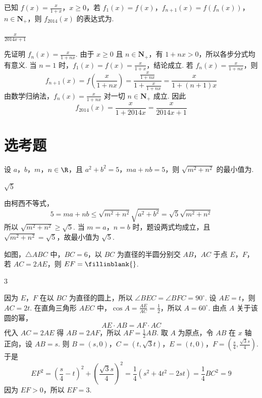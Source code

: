 \begin{problem}
已知 \( f(x) = \frac{x}{1 + x} \)，\( x \geqslant 0 \)，若 \( f_1(x) = f(x) \)，\( f_{n+1}(x) = f(f_n(x)) \)，\( n \in \mathbf{N}_+ \)，则 \( f_{2014}(x) \) 的表达式为\fillinblank{}.
\begin{answer}
\(\frac{x}{2014x+1}\)
\end{answer}
\begin{solution}
先证明 \(f_n(x)=\frac{x}{1+nx}\). 由于 \(x\geqslant0\) 且 \(n\in\mathbf N_+\)，有 \(1+nx>0\)，所以各步分式均有意义. 当 \(n=1\) 时，\(f_1(x)=f(x)=\frac{x}{1+x}\)，结论成立. 若 \(f_n(x)=\frac{x}{1+nx}\)，则
\[
f_{n+1}(x)=f\left(\frac{x}{1+nx}\right)
=\frac{\frac{x}{1+nx}}{1+\frac{x}{1+nx}}
=\frac{x}{1+(n+1)x}
\]
由数学归纳法，\(f_n(x)=\frac{x}{1+nx}\) 对一切 \(n\in\mathbf N_+\) 成立. 因此
\[
f_{2014}(x)=\frac{x}{1+2014x}=\frac{x}{2014x+1}
\]
\end{solution}
\end{problem}

\section{选考题}

\begin{problem}[A]
设 \(a\)，\(b\)，\(m\)，\(n \in \R\)，且 \(a^2 + b^2 = 5\)，\(ma + nb = 5\)，则 \(\sqrt{m^{2} + n^{2}}\) 的最小值为\fillinblank{}.
\begin{answer}
\(\sqrt{5}\)
\end{answer}
\begin{solution}
由柯西不等式，
\[
5=ma+nb\leqslant\sqrt{m^2+n^2}\sqrt{a^2+b^2}
=\sqrt5\sqrt{m^2+n^2}
\]
所以 \(\sqrt{m^2+n^2}\geqslant\sqrt5\). 当 \(m=a\)，\(n=b\) 时，题设两式均成立，且 \(\sqrt{m^2+n^2}=\sqrt5\)，故最小值为 \(\sqrt5\).
\end{solution}
\end{problem}

\reuseproblemnumber
\begin{problem}[B]
如图，\(\triangle ABC\) 中，\(BC = 6\)，以 \(BC\) 为直径的半圆分别交 \(AB\)，\(AC\) 于点 \(E\)，\(F\)，若 \(AC = 2AE\)，则 \(EF =\fillinblank{}\).

\begin{answer}
\(3\)
\end{answer}
\begin{solution}
因为 \(E\)，\(F\) 在以 \(BC\) 为直径的圆上，所以 \(\angle BEC=\angle BFC=90^\circ\). 设 \(AE=t\)，则 \(AC=2t\). 在直角三角形 \(AEC\) 中，\(\cos A=\frac{AE}{AC}=\frac12\)，所以 \(A=60^\circ\).
由点 \(A\) 关于该圆的幂，
\[
AE\cdot AB=AF\cdot AC
\]
代入 \(AC=2AE\) 得 \(AB=2AF\)，所以 \(AF=\frac12AB\). 取 \(A\) 为原点，令 \(AB\) 在 \(x\) 轴正向，设 \(AB=s\). 则 \(B=(s,0)\)，\(C=(t,\sqrt3t)\)，\(E=(t,0)\)，\(F=\left(\frac{s}{4},\frac{\sqrt3s}{4}\right)\).
于是
\[
EF^2=\left(\frac{s}{4}-t\right)^2+\left(\frac{\sqrt3s}{4}\right)^2
=\frac14(s^2+4t^2-2st)=\frac14BC^2=9
\]
因为 \(EF>0\)，所以 \(EF=3\).
\end{solution}
\end{problem}

